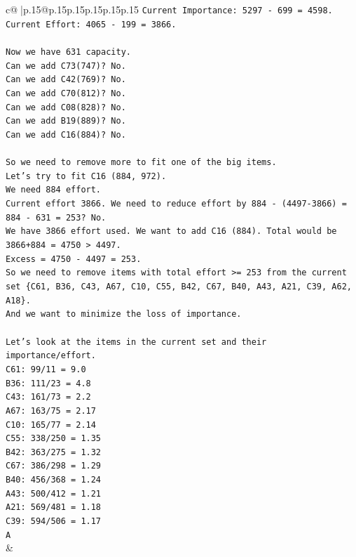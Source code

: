 \documentclass{article}
\begin{document}
{\begin{supertabular}{c@{$\;$}|p{.15\linewidth}@{}p{.15\linewidth}p{.15\linewidth}p{.15\linewidth}p{.15\linewidth}p{.15\linewidth}}
{{{\texttt{Current Importance: 5297 {-} 699 = 4598.} \\
\texttt{Current Effort: 4065 {-} 199 = 3866.} \\
\\ 
\texttt{Now we have 631 capacity.} \\
\texttt{Can we add C73(747)? No.} \\
\texttt{Can we add C42(769)? No.} \\
\texttt{Can we add C70(812)? No.} \\
\texttt{Can we add C08(828)? No.} \\
\texttt{Can we add B19(889)? No.} \\
\texttt{Can we add C16(884)? No.} \\
\\ 
\texttt{So we need to remove more to fit one of the big items.} \\
\texttt{Let's try to fit C16 (884, 972).} \\
\texttt{We need 884 effort.} \\
\texttt{Current effort 3866. We need to reduce effort by 884 {-} (4497{-}3866) = 884 {-} 631 = 253? No.} \\
\texttt{We have 3866 effort used. We want to add C16 (884). Total would be 3866+884 = 4750 > 4497.} \\
\texttt{Excess = 4750 {-} 4497 = 253.} \\
\texttt{So we need to remove items with total effort >= 253 from the current set \{C61, B36, C43, A67, C10, C55, B42, C67, B40, A43, A21, C39, A62, A18\}.} \\
\texttt{And we want to minimize the loss of importance.} \\
\\ 
\texttt{Let's look at the items in the current set and their importance/effort.} \\
\texttt{C61: 99/11 = 9.0} \\
\texttt{B36: 111/23 = 4.8} \\
\texttt{C43: 161/73 = 2.2} \\
\texttt{A67: 163/75 = 2.17} \\
\texttt{C10: 165/77 = 2.14} \\
\texttt{C55: 338/250 = 1.35} \\
\texttt{B42: 363/275 = 1.32} \\
\texttt{C67: 386/298 = 1.29} \\
\texttt{B40: 456/368 = 1.24} \\
\texttt{A43: 500/412 = 1.21} \\
\texttt{A21: 569/481 = 1.18} \\
\texttt{C39: 594/506 = 1.17} \\
\texttt{A} \\
            }
        }
    }
    & \\ \\


\end{supertabular}}
\end{document}

